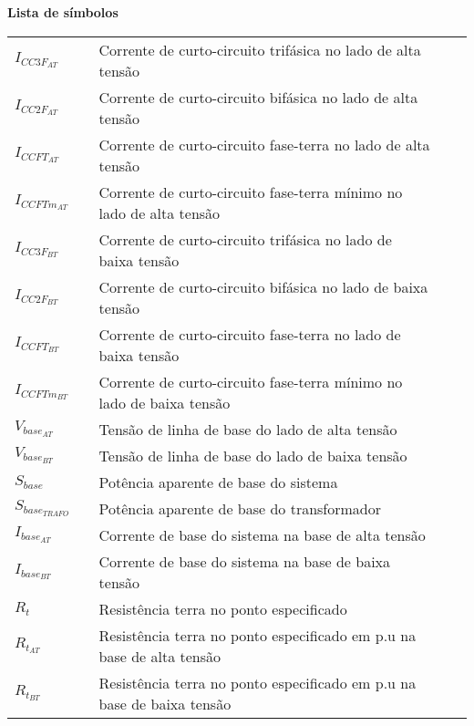 \begin{flushleft}
\textbf{\Large Lista de símbolos}
\end{flushleft}

\begin{table}[H]
\begin{adjustbox}{width=\columnwidth,center}
\begin{tabular}{lllll}
\textbf{$I_{CC3F_{AT}}$} &  & Corrente de curto-circuito trifásica no lado de alta tensão \\
\textbf{$I_{CC2F_{AT}}$} &  & Corrente de curto-circuito bifásica no lado de alta tensão \\
\textbf{$I_{CCFT_{AT}}$} &  & Corrente de curto-circuito fase-terra no lado de alta tensão \\
\textbf{$I_{CCFTm_{AT}}$} &  & Corrente de curto-circuito fase-terra mínimo no lado de alta tensão \\

\textbf{$I_{CC3F_{BT}}$} &  & Corrente de curto-circuito trifásica no lado de baixa tensão \\
\textbf{$I_{CC2F_{BT}}$} &  & Corrente de curto-circuito bifásica no lado de baixa tensão \\
\textbf{$I_{CCFT_{BT}}$} &  & Corrente de curto-circuito fase-terra no lado de baixa tensão \\
\textbf{$I_{CCFTm_{BT}}$} &  & Corrente de curto-circuito fase-terra mínimo no lado de baixa tensão \\

\textbf{$V_{base_{AT}}$} &  & Tensão de linha de base do lado de alta tensão \\
\textbf{$V_{base_{BT}}$} &  & Tensão de linha de base do lado de baixa tensão \\
\textbf{$S_{base}$} &  & Potência aparente de base do sistema \\
\textbf{$S_{base_{TRAFO}}$} &  & Potência aparente de base do transformador \\
\textbf{$I_{base_{AT}}$} &  & Corrente de base do sistema na base de alta tensão \\
\textbf{$I_{base_{BT}}$} &  & Corrente de base do sistema na base de baixa tensão \\

\textbf{$R_t$} &  & Resistência terra no ponto especificado \\
\textbf{$R_{t_{AT}}$} &  & Resistência terra no ponto especificado em p.u na base de alta tensão \\
\textbf{$R_{t_{BT}}$} &  & Resistência terra no ponto especificado em p.u na base de baixa tensão \\


\end{tabular}
\end{adjustbox}
\end{table}
